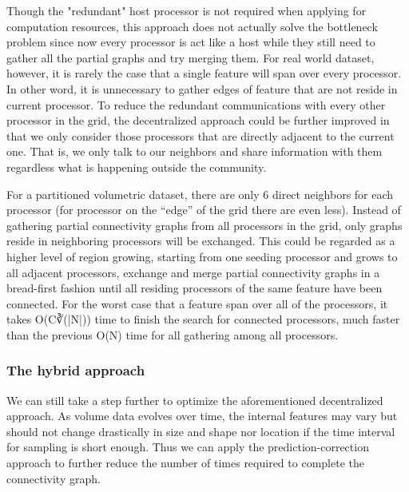 \documentclass[10pt, conference, compsocconf]{IEEEtran}
\begin{document}
Though the "redundant" host processor is not required when applying for computation resources, this approach does not actually solve the bottleneck problem since now every processor is act like a host while they still need to gather all the partial graphs and try merging them. For real world dataset, however, it is rarely the case that a single feature will span over every processor. In other word, it is unnecessary to gather edges of feature that are not reside in current processor. To reduce the redundant communications with every other processor in the grid, the decentralized approach could be further improved in that we only consider those processors that are directly adjacent to the current one. That is, we only talk to our neighbors and share information with them regardless what is happening outside the community. 

For a partitioned volumetric dataset, there are only 6 direct neighbors for each processor (for processor on the “edge” of the grid there are even less). Instead of gathering partial connectivity graphs from all processors in the grid, only graphs reside in neighboring processors will be exchanged. This could be regarded as a higher level of region growing, starting from one seeding processor and grows to all adjacent processors, exchange and merge partial connectivity graphs in a bread-first fashion until all residing processors of the same feature have been connected. For the worst case that a feature span over all of the processors, it takes O(C∛(|N|)) time to finish the search for connected processors, much faster than the previous O(N) time for all gathering among all processors.

\subsubsection{The hybrid approach}
We can still take a step further to optimize the aforementioned decentralized approach. As volume data evolves over time, the internal features may vary but should not change drastically in size and shape nor location if the time interval for sampling is short enough. Thus we can apply the prediction-correction approach to further reduce the number of times required to complete the connectivity graph. 
\end{document}
